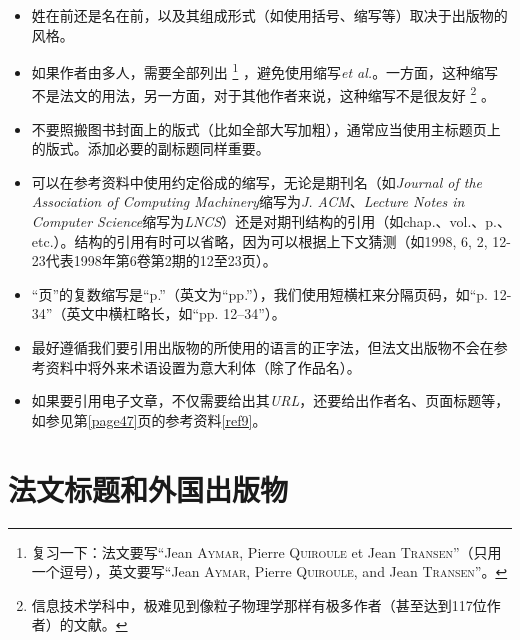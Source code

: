 \begin{itemize}
    \item 姓在前还是名在前，以及其组成形式（如使用括号、缩写等）取决于出版物的风格。
    \item 如果作者由多人，需要全部列出
        \footnote{复习一下：法文要写“Jean \textsc{Aymar}, Pierre \textsc{Quiroule} et Jean \textsc{Transen}”（只用一个逗号），英文要写“Jean \textsc{Aymar}, Pierre \textsc{Quiroule}, and Jean \textsc{Transen}”。}
    ，避免使用缩写\emph{et al.}。一方面，这种缩写不是法文的用法，另一方面，对于其他作者来说，这种缩写不是很友好
        \footnote{信息技术学科中，极难见到像粒子物理学那样有极多作者（甚至达到117位作者）的文献。}
    。
    \item 不要照搬图书封面上的版式（比如全部大写加粗），通常应当使用主标题页上的版式。添加必要的副标题同样重要。
    \item 可以在参考资料中使用约定俗成的缩写，无论是期刊名（如\emph{Journal of the Association of Computing Machinery}缩写为\emph{J. ACM}、\emph{Lecture Notes in Computer Science}缩写为\emph{LNCS}）还是对期刊结构的引用（如chap.、vol.、p.、etc.）。结构的引用有时可以省略，因为可以根据上下文猜测（如1998, 6, 2, 12-23代表1998年第6卷第2期的12至23页）。
    \item “页”的复数缩写是“p.”（英文为“pp.”），我们使用短横杠来分隔页码，如“p. 12-34”（英文中横杠略长，如“pp. 12--34”）。
    \item 最好遵循我们要引用出版物的所使用的语言的正字法，但法文出版物不会在参考资料中将外来术语设置为意大利体（除了作品名）。
    \item 如果要引用电子文章，不仅需要给出其\emph{URL}，还要给出作者名、页面标题等，如参见第\ref{page47}页的参考资料\ref{ref9}。%
\end{itemize}

\section{法文标题和外国出版物}
